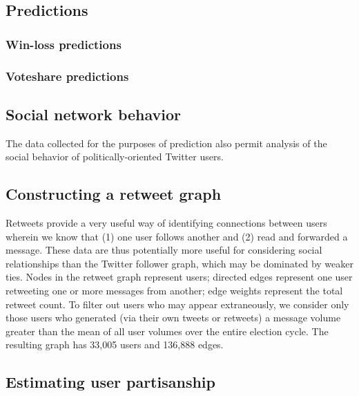 \documentclass[11pt]{article}
\begin{document}
\subsection{Predictions}
\label{sec:predictions}


\subsubsection{Win-loss predictions}
\label{sec:win-loss-predictions}

\subsubsection{Voteshare predictions}
\label{sec:votesh-pred}




\subsection{Social network behavior}
\label{sec:soci-netw-behav}

The data collected for the purposes of prediction also permit analysis
of the social behavior of politically-oriented Twitter users. 

\subsection{Constructing a retweet graph}
\label{sec:constr-retw-graph}

Retweets provide a very useful way of identifying connections between
users wherein we know that (1) one user follows another and (2) read
and forwarded a message. These data are thus potentially more useful
for considering social relationships than the Twitter follower graph,
which may be dominated by weaker ties. Nodes in the retweet graph
represent users; directed edges represent one user retweeting one or
more messages from another; edge weights represent the total retweet
count. To filter out users who may appear extraneously, we consider
only those users who generated (via their own tweets or retweets) a
message volume greater than the mean of all user volumes over the
entire election cycle. The resulting graph has 33,005 users and
136,888 edges. 



\subsection{Estimating user partisanship}
\label{sec:estim-user-part}
\end{document}
